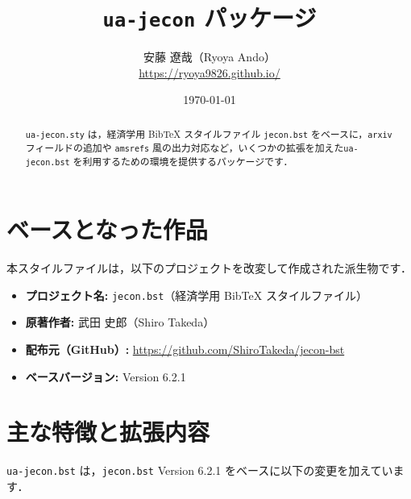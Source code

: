 \documentclass[uplatex,dvipdfmx,ja = standard,a4paper,11pt]{bxjsarticle}
\title{\texttt{ua-jecon} パッケージ}
\author{安藤 遼哉（Ryoya Ando）\\\url{https://ryoya9826.github.io/}}
\date{\today}
\begin{document}
\maketitle
\begin{abstract}
\noindent
\texttt{ua-jecon.sty} は，経済学用 BibTeX スタイルファイル \texttt{jecon.bst} をベースに，\texttt{arxiv} フィールドの追加や \texttt{amsrefs} 風の出力対応など，いくつかの拡張を加えた\texttt{ua-jecon.bst} を利用するための環境を提供するパッケージです．
\end{abstract}

\section{ベースとなった作品}

本スタイルファイルは，以下のプロジェクトを改変して作成された派生物です．

\begin{itemize}
\item \textbf{プロジェクト名:} \texttt{jecon.bst}（経済学用 BibTeX スタイルファイル）
\item \textbf{原著作者:} 武田 史郎（Shiro Takeda）
\item \textbf{配布元（GitHub）:} \url{https://github.com/ShiroTakeda/jecon-bst}
\item \textbf{ベースバージョン:} Version 6.2.1
\end{itemize}

\section{主な特徴と拡張内容}

\texttt{ua-jecon.bst} は，\texttt{jecon.bst} Version 6.2.1 をベースに以下の変更を加えています．
\end{document}
